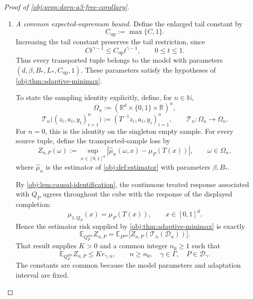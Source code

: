 \documentclass[11pt]{article}
\begin{document}
\begin{proof}[Proof of \cref{obj:prop:dorn-a3-free-corollary}]
\begin{enumerate}
Finally, the product construction and its affine transport give
\[
Y=AY(1)+(1-A)Y(0)
\quad\text{almost surely},
\qquad
(Y(0),Y(1))\perp A\mid X^T.
\]
These are \cref{obj:ass:consistency,obj:ass:exchangeability}. Together with the density, tail, response-bound, and smoothness calculations, they verify every restriction in \cref{obj:def:model}. Consequently,
\[
Q_P\in\mathcal P_\gamma
\quad\text{with}\quad
(B,L,C,c_f)=(B_*,L_*,C,1),
\]
with the exhibited causal completion \(\Pi_P^T\).

\item \emph{A common expected-supremum bound.}
Define the enlarged tail constant by
\[
C_{\mathrm{up}}:=\max\{C,1\}.
\]
Increasing the tail constant preserves the tail restriction, since
\[
Ct^{\gamma-1}\le C_{\mathrm{up}}t^{\gamma-1},
\qquad 0\le t\le1.
\]
Thus every transported tuple belongs to the model with parameters
\((d,\beta,B_*,L_*,C_{\mathrm{up}},1)\). These parameters satisfy the hypotheses of \cref{obj:thm:adaptive-minimax}.

To state the sampling identity explicitly, define, for \(n\in\mathbb N\),
\[
\Omega_n:=
(\mathbb R^d\times\{0,1\}\times\mathbb R)^n,
\]
\[
\mathcal T_n\bigl((z_i,a_i,y_i)_{i=1}^n\bigr)
:=
(T^{-1}z_i,a_i,y_i)_{i=1}^n,
\qquad
\mathcal T_n:\Omega_n\to\Omega_n.
\]
For \(n=0\), this is the identity on the singleton empty sample. For every source tuple, define the transported-sample loss by
\[
Z_{n,P}(\omega)
:=
\sup_{x\in[0,1]^d}
|\widehat\mu_n(\omega,x)-\mu_P(T(x))|,
\qquad \omega\in\Omega_n,
\]
where \(\widehat\mu_n\) is the estimator of \cref{obj:def:estimator} with parameters \(\beta,B_*\).

By \cref{obj:lem:causal-identification}, the continuous treated response associated with \(Q_P\) agrees throughout the cube with the response of the displayed completion:
\[
\mu_{1,Q_P}(x)=\mu_P(T(x)),
\qquad x\in[0,1]^d.
\]
Hence the estimator risk supplied by \cref{obj:thm:adaptive-minimax} is exactly
\[
\mathbb E_{Q_P^{\otimes n}}Z_{n,P}
=
\mathbb E_{P^{\otimes n}}
\bigl[Z_{n,P}(\mathcal T_n(\mathcal D_n))\bigr].
\]
That result supplies \(K>0\) and a common integer \(n_0\ge1\) such that
\[
\mathbb E_{Q_P^{\otimes n}}Z_{n,P}
\le K r_{\gamma,n},
\qquad
n\ge n_0,\quad \gamma\in\Gamma,\quad P\in\mathcal D_\gamma.
\]
The constants are common because the model parameters and adaptation interval are fixed.


\end{enumerate}
\end{proof}
\end{document}
